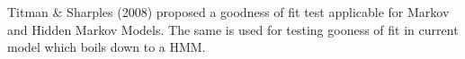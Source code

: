 \documentclass{uwstat572}
\begin{document}
Titman \& Sharples (2008) proposed a goodness of fit test applicable for Markov and Hidden Markov Models. The same is used for testing gooness of fit in current model which  boils down to a HMM.

\end{document}
